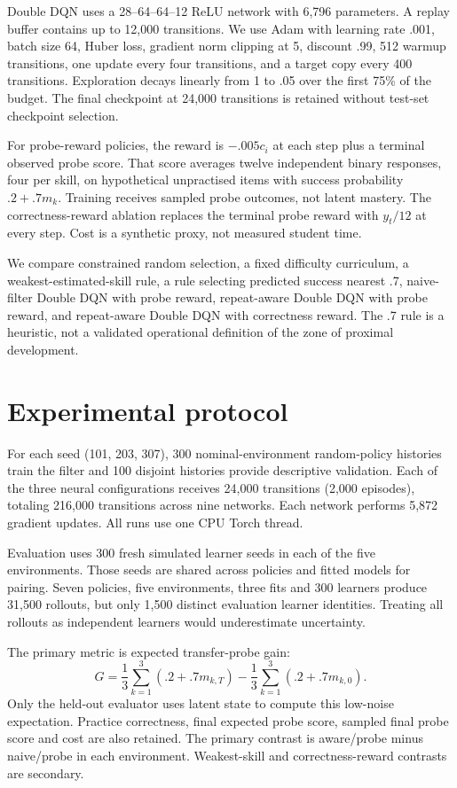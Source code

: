 \documentclass[11pt,a4paper]{article}
\begin{document}
Double DQN uses a 28--64--64--12 ReLU network with 6,796 parameters. A replay buffer contains up to 12,000 transitions. We use Adam with learning rate .001, batch size 64, Huber loss, gradient norm clipping at 5, discount .99, 512 warmup transitions, one update every four transitions, and a target copy every 400 transitions. Exploration decays linearly from 1 to .05 over the first 75\% of the budget. The final checkpoint at 24,000 transitions is retained without test-set checkpoint selection.

For probe-reward policies, the reward is $-.005c_i$ at each step plus a terminal observed probe score. That score averages twelve independent binary responses, four per skill, on hypothetical unpractised items with success probability $.2+.7m_k$. Training receives sampled probe outcomes, not latent mastery. The correctness-reward ablation replaces the terminal probe reward with $y_t/12$ at every step. Cost is a synthetic proxy, not measured student time.

We compare constrained random selection, a fixed difficulty curriculum, a weakest-estimated-skill rule, a rule selecting predicted success nearest .7, naive-filter Double DQN with probe reward, repeat-aware Double DQN with probe reward, and repeat-aware Double DQN with correctness reward. The .7 rule is a heuristic, not a validated operational definition of the zone of proximal development.

\section{Experimental protocol}
For each seed (101, 203, 307), 300 nominal-environment random-policy histories train the filter and 100 disjoint histories provide descriptive validation. Each of the three neural configurations receives 24,000 transitions (2,000 episodes), totaling 216,000 transitions across nine networks. Each network performs 5,872 gradient updates. All runs use one CPU Torch thread.

Evaluation uses 300 fresh simulated learner seeds in each of the five environments. Those seeds are shared across policies and fitted models for pairing. Seven policies, five environments, three fits and 300 learners produce 31,500 rollouts, but only 1,500 distinct evaluation learner identities. Treating all rollouts as independent learners would underestimate uncertainty.

The primary metric is expected transfer-probe gain:
\begin{equation}
G=\frac{1}{3}\sum_{k=1}^3 (.2+.7m_{k,T})-\frac{1}{3}\sum_{k=1}^3 (.2+.7m_{k,0}).
\end{equation}
Only the held-out evaluator uses latent state to compute this low-noise expectation. Practice correctness, final expected probe score, sampled final probe score and cost are also retained. The primary contrast is aware/probe minus naive/probe in each environment. Weakest-skill and correctness-reward contrasts are secondary.
\end{document}
